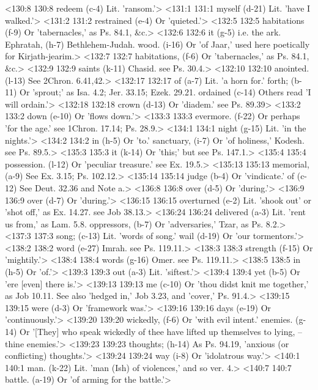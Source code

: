 <130:8 130:8  redeem (c-4)  Lit. 'ransom.'>
<131:1 131:1  myself (d-21)  Lit. 'have I walked.'>
<131:2 131:2  restrained (e-4)  Or 'quieted.'>
<132:5 132:5  habitations (f-9)  Or 'tabernacles,' as Ps. 84.1, &c.>
<132:6 132:6  it (g-5)  i.e. the ark.
  Ephratah, (h-7)  Bethlehem-Judah.
  wood. (i-16)  Or 'of Jaar,' used here poetically for Kirjath-jearim.>
<132:7 132:7  habitations, (f-6)  Or 'tabernacles,' as Ps. 84.1, &c.>
<132:9 132:9  saints (k-11)  Chasid. see Ps. 30.4.>
<132:10 132:10  anointed. (l-13)  See 2Chron. 6.41,42.>
<132:17 132:17  of (a-7)  Lit. 'a horn for.'
  forth; (b-11)  Or 'sprout;' as Isa. 4.2; Jer. 33.15; Ezek. 29.21.
  ordained (c-14)  Others read 'I will ordain.'>
<132:18 132:18  crown (d-13)  Or 'diadem.' see Ps. 89.39>
<133:2 133:2  down (e-10)  Or 'flows down.'>
<133:3 133:3  evermore. (f-22)  Or perhaps 'for the age.' see 1Chron. 17.14; Ps. 28.9.>
<134:1 134:1  night (g-15)  Lit. 'in the nights.'>
<134:2 134:2  in (h-5)  Or 'to.'
  sanctuary, (i-7)  Or 'of holiness,' Kodesh. see Ps. 89.5.>
<135:3 135:3  it (k-14)  Or 'this;' but see Ps. 147.1.>
<135:4 135:4  possession. (l-12)  Or 'peculiar treasure.' see Ex. 19.5.>
<135:13 135:13  memorial, (a-9)  See Ex. 3.15; Ps. 102.12.>
<135:14 135:14  judge (b-4)  Or 'vindicate.'
  of (c-12)  See Deut. 32.36 and Note a.>
<136:8 136:8  over (d-5) Or 'during.'>
<136:9 136:9  over (d-7)  Or 'during.'>
<136:15 136:15  overturned (e-2)  Lit. 'shook out' or 'shot off,' as Ex. 14.27. see Job 38.13.>
<136:24 136:24  delivered (a-3)  Lit. 'rent us from,' as Lam. 5.8.
  oppressors, (b-7)  Or 'adversaries,' Tzar, as Ps. 8.2.>
<137:3 137:3  song; (c-13)  Lit. 'words of song.'
  wail (d-19)  Or 'our tormentors.'>
<138:2 138:2  word (e-27)  Imrah. see Ps. 119.11.>
<138:3 138:3  strength (f-15)  Or 'mightily.'>
<138:4 138:4  words (g-16)  Omer. see Ps. 119.11.>
<138:5 138:5  in (h-5)  Or 'of.'>
<139:3 139:3  out (a-3)  Lit. 'siftest.'>
<139:4 139:4  yet (b-5)  Or 'ere [even] there is.'>
<139:13 139:13  me (c-10)  Or 'thou didst knit me together,' as Job 10.11. See also  'hedged in,' Job 3.23, and 'cover,' Ps. 91.4.>
<139:15 139:15  were (d-3)  Or 'framework was.'>
<139:16 139:16  days (e-19)  Or 'continuously.'>
<139:20 139:20  wickedly, (f-6)  Or 'with evil intent.'
  enemies. (g-14)  Or '[They] who speak wickedly of thee have lifted up  themselves to lying, -- thine enemies.'>
<139:23 139:23  thoughts; (h-14)  As Ps. 94.19, 'anxious (or conflicting) thoughts.'>
<139:24 139:24  way (i-8)  Or 'idolatrous way.'>
<140:1 140:1  man. (k-22)  Lit. 'man (Ish) of violences,' and so ver. 4.>
<140:7 140:7  battle. (a-19)  Or 'of arming for the battle.'>
